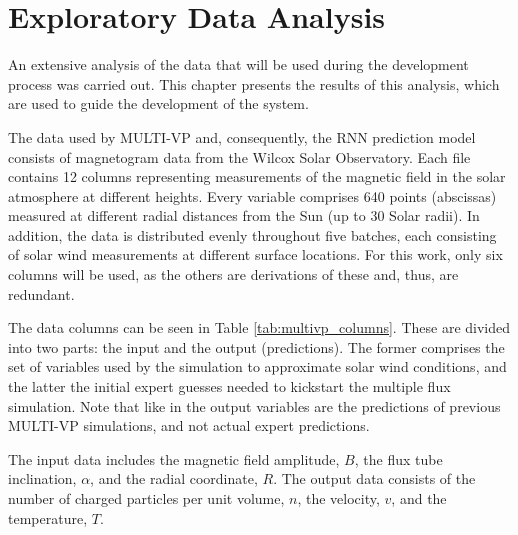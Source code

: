 \chapter{Exploratory Data Analysis}\label{chap:eda}
An extensive analysis of the data that will be used during the development process was carried out. This chapter presents the results of this analysis, which are used to guide the development of the system.

The data used by MULTI-VP and, consequently, the RNN prediction model consists of magnetogram data from the Wilcox Solar Observatory. Each file contains 12 columns representing measurements of the magnetic field in the solar atmosphere at different heights. Every variable comprises 640 points (abscissas) measured at different radial distances from the Sun (up to 30 Solar radii). In addition, the data is distributed evenly throughout five batches, each consisting of solar wind measurements at different surface locations. For this work, only six columns will be used, as the others are derivations of these and, thus, are redundant. 

The data columns can be seen in Table \ref{tab:multivp_columns}. These are divided into two parts: the input and the output (predictions). The former comprises the set of variables used by the simulation to approximate solar wind conditions, and the latter the initial expert guesses needed to kickstart the multiple flux simulation. Note that like in \cite{barros_InitialConditionEstimation_} the output variables are the predictions of previous MULTI-VP simulations, and not actual expert predictions.

The input data includes the magnetic field amplitude, $B$, the flux tube inclination, $\alpha$, and the radial coordinate, $R$. The output data consists of the number of charged particles per unit volume, $n$, the velocity, $v$, and the temperature, $T$.

